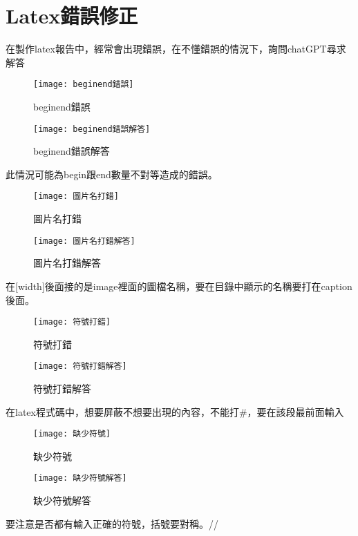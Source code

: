 \chapter{Latex錯誤修正}
在製作latex報告中，經常會出現錯誤，在不懂錯誤的情況下，詢問chatGPT尋求解答
\begin{figure}[ht]
  \begin{minipage}{0.5\textwidth}
    \centering
    \texttt{[image: beginend錯誤]}
    \caption{beginend錯誤}
  \end{minipage}%
  \begin{minipage}{0.5\textwidth}
    \centering
    \texttt{[image: beginend錯誤解答]}
    \caption{beginend錯誤解答}
  \end{minipage}
\end{figure}
此情況可能為begin跟end數量不對等造成的錯誤。\\
\begin{figure}[ht]
  \begin{minipage}{0.5\textwidth}
    \centering
    \texttt{[image: 圖片名打錯]}
    \caption{圖片名打錯}
  \end{minipage}%
  \begin{minipage}{0.5\textwidth}
    \centering
    \texttt{[image: 圖片名打錯解答]}
    \caption{圖片名打錯解答}
  \end{minipage}
\end{figure}
在[width]後面接的是image裡面的圖檔名稱，要在目錄中顯示的名稱要打在caption後面。\\

\begin{figure}[ht]
  \begin{minipage}{0.5\textwidth}
    \centering
    \texttt{[image: 符號打錯]}
    \caption{符號打錯}
  \end{minipage}%
  \begin{minipage}{0.5\textwidth}
    \centering
    \texttt{[image: 符號打錯解答]}
    \caption{符號打錯解答}
  \end{minipage}
\end{figure}
在latex程式碼中，想要屏蔽不想要出現的內容，不能打#，要在該段最前面輸入%

\begin{figure}[ht]
  \begin{minipage}{0.5\textwidth}
    \centering
    \texttt{[image: 缺少符號]}
    \caption{缺少符號}
  \end{minipage}%
  \begin{minipage}{0.5\textwidth}
    \centering
    \texttt{[image: 缺少符號解答]}
    \caption{缺少符號解答}
  \end{minipage}
\end{figure}
要注意是否都有輸入正確的符號，括號要對稱。//

